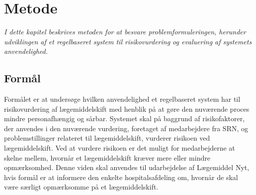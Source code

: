 \chapter{Metode}
\textit{I dette kapitel beskrives metoden for at besvare problemformuleringen, herunder udviklingen af et regelbaseret system til risikovurdering og evaluering af systemets anvendelighed.}

\section{Formål}
Formålet er at undersøge hvilken anvendelighed et regelbaseret system har til risikovurdering af lægemiddelskift med henblik på at gøre den nuværende proces mindre personafhængig og sårbar. Systemet skal på baggrund af risikofaktorer, der anvendes i den nuværende vurdering, foretaget af medarbejdere fra SRN, og problemstillinger relateret til lægemiddelskift, vurderer risikoen ved lægemiddelskift. Ved at vurdere risikoen er det muligt for medarbejderne at skelne mellem, hvornår et lægemiddelskift kræver mere eller mindre opmærksomhed. Denne viden skal anvendes til udarbejdelse af Lægemiddel Nyt, hvis formål er at informere den enkelte hospitalsafdeling om, hvornår de skal være særligt opmærksomme på et lægemiddelskift.





